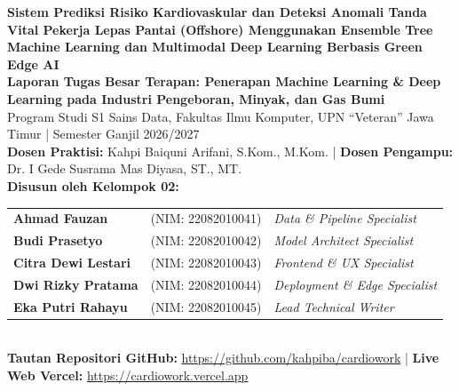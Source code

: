 \documentclass[a4paper,11pt]{article}
\begin{document}
\begin{center}
    {\Large \textbf{Sistem Prediksi Risiko Kardiovaskular dan Deteksi Anomali Tanda Vital Pekerja Lepas Pantai (Offshore) Menggunakan Ensemble Tree Machine Learning dan Multimodal Deep Learning Berbasis Green Edge AI}}\\[1.5em]
    
    {\small \textbf{Laporan Tugas Besar Terapan: Penerapan Machine Learning \& Deep Learning pada Industri Pengeboran, Minyak, dan Gas Bumi}}\\[0.4em]
    {\footnotesize Program Studi S1 Sains Data, Fakultas Ilmu Komputer, UPN ``Veteran'' Jawa Timur | Semester Ganjil 2026/2027}\\[0.4em]
    {\footnotesize \textbf{Dosen Praktisi:} Kahpi Baiquni Arifani, S.Kom., M.Kom. \quad | \quad \textbf{Dosen Pengampu:} Dr. I Gede Susrama Mas Diyasa, ST., MT.}\\[1.2em]
    
    \textbf{Disusun oleh Kelompok 02:}\\[0.3em]
    \begin{tabular}{lll}
        \textbf{Ahmad Fauzan} & (NIM: 22082010041) & \textit{Data \& Pipeline Specialist} \\
        \textbf{Budi Prasetyo} & (NIM: 22082010042) & \textit{Model Architect Specialist} \\
        \textbf{Citra Dewi Lestari} & (NIM: 22082010043) & \textit{Frontend \& UX Specialist} \\
        \textbf{Dwi Rizky Pratama} & (NIM: 22082010044) & \textit{Deployment \& Edge Specialist} \\
        \textbf{Eka Putri Rahayu} & (NIM: 22082010045) & \textit{Lead Technical Writer} \\
    \end{tabular}\\[1em]
    
    {\footnotesize \textbf{Tautan Repositori GitHub:} \href{https://github.com/kahpiba/cardiowork}{https://github.com/kahpiba/cardiowork} \quad | \quad \textbf{Live Web Vercel:} \href{https://cardiowork.vercel.app}{https://cardiowork.vercel.app}}
\end{center}

\vspace{0.8em}
\noindent\hrulefill
\vspace{0.8em}
\end{document}
